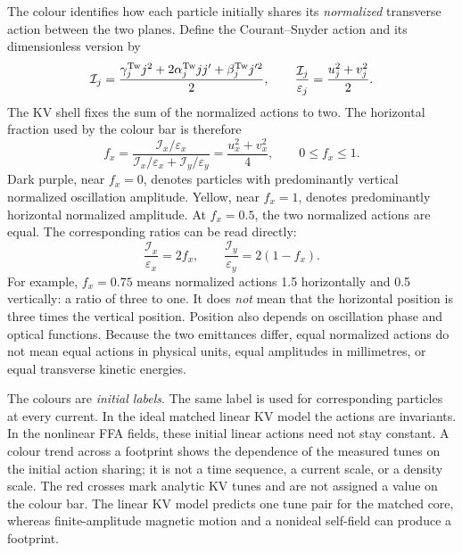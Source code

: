 The colour identifies how each particle initially shares its \emph{normalized}
transverse action between the two planes. Define the Courant--Snyder action
and its dimensionless version by
\begin{equation}
 \mathcal I_j=\frac{\gamma_j^{\rm Tw}j^2+2\alpha_j^{\rm Tw}jj'
                         +\beta_j^{\rm Tw}j'^2}{2},\qquad
 \frac{\mathcal I_j}{\varepsilon_j}=\frac{u_j^2+v_j^2}{2}.
 \label{eq:sc-actions}
\end{equation}
The KV shell fixes the sum of the normalized actions to two. The horizontal
fraction used by the colour bar is therefore
\begin{equation}
 \boxed{f_x=
 \frac{\mathcal I_x/\varepsilon_x}
      {\mathcal I_x/\varepsilon_x+\mathcal I_y/\varepsilon_y}
 =\frac{u_x^2+v_x^2}{4},\qquad 0\leq f_x\leq1.}
 \label{eq:sc-colour}
\end{equation}
Dark purple, near $f_x=0$, denotes particles with predominantly vertical
normalized oscillation amplitude. Yellow, near $f_x=1$, denotes predominantly
horizontal normalized amplitude. At $f_x=0.5$, the two normalized actions are
equal. The corresponding ratios can be read directly:
\begin{equation}
 \frac{\mathcal I_x}{\varepsilon_x}=2f_x,\qquad
 \frac{\mathcal I_y}{\varepsilon_y}=2(1-f_x).
 \label{eq:sc-colour-examples}
\end{equation}
For example, $f_x=0.75$ means normalized actions 1.5 horizontally and 0.5
vertically: a ratio of three to one. It does \emph{not} mean that the horizontal
position is three times the vertical position. Position also depends on
oscillation phase and optical functions. Because the two emittances differ,
equal normalized actions do not mean equal actions in physical units, equal
amplitudes in millimetres, or equal transverse kinetic energies.

The colours are \emph{initial labels}. The same label is used for corresponding
particles at every current. In the ideal matched linear KV model the actions
are invariants. In the nonlinear FFA fields, these initial linear actions need
not stay constant. A colour trend across a footprint shows the dependence of
the measured tunes on the initial action sharing; it is not a time sequence,
a current scale, or a density scale. The red crosses mark analytic KV tunes
and are not assigned a value on the colour bar. The linear KV model predicts
one tune pair for the matched core, whereas finite-amplitude magnetic motion
and a nonideal self-field can produce a footprint.

